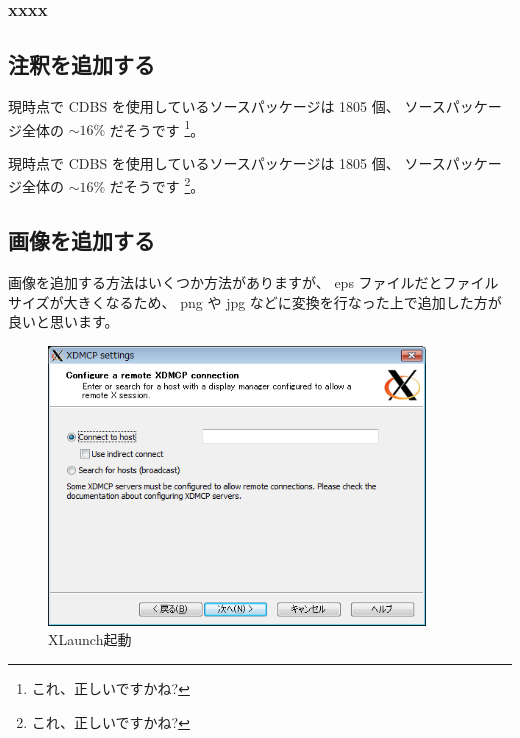 \documentclass[mingoth,a4paper]{jsarticle}
\begin{document}
\begin{commandline}
\begin{commandline}
\subsubsection{xxxx} %

\end{commandline}

\subsection{注釈を追加する}

現時点で CDBS を使用しているソースパッケージは 1805 個、
ソースパッケージ全体の $\sim 16 \%$ だそうです
\footnote{これ、正しいですかね? }。

\begin{commandline}
現時点で CDBS を使用しているソースパッケージは 1805 個、
ソースパッケージ全体の $\sim 16 \%$ だそうです
\footnote{これ、正しいですかね? }。
\end{commandline}

\subsection{画像を追加する}
\label{sec:addpicture}

画像を追加する方法はいくつか方法がありますが、
eps ファイルだとファイルサイズが大きくなるため、
png や jpg などに変換を行なった上で追加した方が
良いと思います。


\begin{figure}[htbp]
 \begin{center}
  \includegraphics[width=100mm]{image200808/colinux_xlaunch_xdmcp.png}
 \end{center}
 \caption{XLaunch起動}
 \label{fig:colinux_xlaunch_xdmcp}
\end{figure}


\end{commandline}
\end{document}
